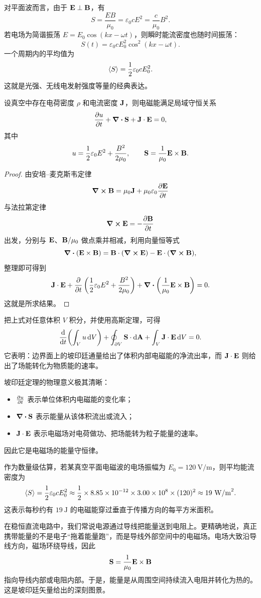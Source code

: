 对平面波而言，由于 $\vb{E}\perp\vb{B}$，有
\[
S=\frac{EB}{\mu_0}=\varepsilon_0 c E^2=\frac{c}{\mu_0}B^2.
\]
若电场为简谐振荡 $E=E_0\cos(kx-\omega t)$，则瞬时能流密度也随时间振荡：
\[
S(t)=\varepsilon_0 c E_0^2 \cos^2(kx-\omega t).
\]
一个周期内的平均值为
\[
\langle S \rangle=\frac{1}{2}\varepsilon_0 c E_0^2.
\]
这就是光强、无线电发射强度等量的经典表达。

\begin{theorem}[坡印廷定理的真空形式]
设真空中存在电荷密度 $\rho$ 和电流密度 $\vb{J}$，则电磁能满足局域守恒关系
\[
\pdv{u}{t}+\div \vb{S}+\vb{J}\cdot\vb{E}=0,
\]
其中
\[
 u=\frac{1}{2}\varepsilon_0 E^2+\frac{B^2}{2\mu_0},
 \qquad
 \vb{S}=\frac{1}{\mu_0}\vb{E}\times\vb{B}.
\]
\end{theorem}

\begin{proof}
由安培--麦克斯韦定律
\[
\curl\vb{B}=\mu_0\vb{J}+\mu_0\varepsilon_0\pdv{\vb{E}}{t}
\]
与法拉第定律
\[
\curl\vb{E}=-\pdv{\vb{B}}{t}
\]
出发，分别与 $\vb{E}$、$\vb{B}/\mu_0$ 做点乘并相减，利用向量恒等式
\[
\div(\vb{E}\times\vb{B})=\vb{B}\cdot(\curl\vb{E})-\vb{E}\cdot(\curl\vb{B}),
\]
整理即可得到
\[
\vb{J}\cdot\vb{E}+\pdv{}{t}\left(\frac{1}{2}\varepsilon_0 E^2+\frac{B^2}{2\mu_0}\right)+\div\left(\frac{1}{\mu_0}\vb{E}\times\vb{B}\right)=0.
\]
这就是所求结果。
\end{proof}

把上式对任意体积 $V$ 积分，并使用高斯定理，可得
\[
\dv{}{t}\!\left(\int_V u\,\dd V\right)+\oint_{\partial V}\vb{S}\cdot\dd\vb{A}+\int_V \vb{J}\cdot\vb{E}\,\dd V=0.
\]
它表明：边界面上的坡印廷通量给出了体积内部电磁能的净流出率，而 $\vb{J}\cdot\vb{E}$ 则给出了场能转化为物质能的速率。

坡印廷定理的物理意义极其清晰：
\begin{itemize}
  \item $\pdv{u}{t}$ 表示单位体积内电磁能的变化率；
  \item $\div\vb{S}$ 表示能量从该体积流出或流入；
  \item $\vb{J}\cdot\vb{E}$ 表示电磁场对电荷做功、把场能转为粒子能量的速率。
\end{itemize}
因此它是电磁场的能量守恒律。

作为数量级估算，若某真空平面电磁波的电场振幅为 $E_0=120\ \text{V/m}$，则平均能流密度为
\[
\langle S \rangle=\frac{1}{2}\varepsilon_0 c E_0^2
\approx \frac{1}{2}\times 8.85\times10^{-12}\times 3.00\times10^8\times (120)^2
\approx 19\ \text{W/m}^2.
\]
这表示每秒约有 $19\ \text{J}$ 的电磁能穿过垂直于传播方向的每平方米面积。

\begin{remark}
在稳恒直流电路中，我们常说电源通过导线把能量送到电阻上。更精确地说，真正携带能量的不是电子“拖着能量跑”，而是导线外部空间中的电磁场。电场大致沿导线方向，磁场环绕导线，因此
\[
\vb{S}=\frac{1}{\mu_0}\vb{E}\times\vb{B}
\]
指向导线内部或电阻内部。于是，能量是从周围空间持续流入电阻并转化为热的。这是坡印廷矢量给出的深刻图景。
\end{remark}


